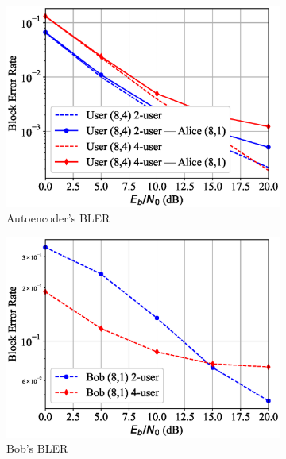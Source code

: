 \begin{figure}[tp!]
	\begin{subfigure}{0.28\textwidth}
		\includegraphics[width=\linewidth]{figs/multi_covert_autoencoder_bler_rician}
		\caption{Autoencoder's BLER}
		\label{fig:multi_rician_results_ae}
	\end{subfigure}
	\hspace*{\fill}
	\begin{subfigure}{0.28\textwidth}
		\includegraphics[width=\linewidth]{figs/multi_bob_bler_rician}
		\caption{Bob's BLER}
		\label{fig:multi_rician_results_bob}	
	\end{subfigure}
	\hspace*{\fill}
	\begin{subfigure}{0.28\textwidth}

\end{subfigure}
\end{figure}
